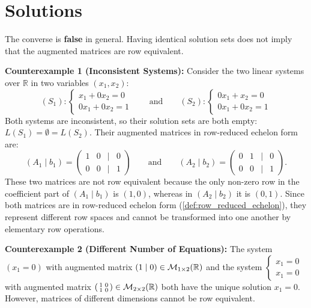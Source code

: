 \section{Solutions}\label{sec:solutions_linear_equations}

\begin{exercisesolution}
\label{sol:converse_ero_solution_set}
The converse is \textbf{false} in general. Having identical solution sets does not imply that the augmented matrices are row equivalent.

\textbf{Counterexample 1 (Inconsistent Systems):}
Consider the two linear systems over $\mathbb{R}$ in two variables $(x_1, x_2)$:
\[
(S_1): \begin{cases} x_1 + 0x_2 = 0 \\ 0x_1 + 0x_2 = 1 \end{cases} \qquad\text{and}\qquad (S_2): \begin{cases} 0x_1 + x_2 = 0 \\ 0x_1 + 0x_2 = 1 \end{cases}
\]
Both systems are inconsistent, so their solution sets are both empty: $L(S_1) = \emptyset = L(S_2)$.
Their augmented matrices in row-reduced echelon form are:
\[
(A_1 \mid b_1) = \begin{pmatrix} 1 & 0 & \big| & 0 \\ 0 & 0 & \big| & 1 \end{pmatrix} \qquad\text{and}\qquad (A_2 \mid b_2) = \begin{pmatrix} 0 & 1 & \big| & 0 \\ 0 & 0 & \big| & 1 \end{pmatrix}.
\]
These two matrices are not row equivalent because the only non-zero row in the coefficient part of $(A_1 \mid b_1)$ is $(1, 0)$, whereas in $(A_2 \mid b_2)$ it is $(0, 1)$. Since both matrices are in row-reduced echelon form (\cref{def:row_reduced_echelon}), they represent different row spaces and cannot be transformed into one another by elementary row operations.

\textbf{Counterexample 2 (Different Number of Equations):}
The system $(x_1 = 0)$ with augmented matrix $(1 \mid 0) \in \mathcal{M}_{1 \times 2}(\mathbb{R})$ and the system $\begin{cases} x_1 = 0 \\ x_1 = 0 \end{cases}$ with augmented matrix $\left(\begin{smallmatrix} 1 & 0 \\ 1 & 0 \end{smallmatrix}\right) \in \mathcal{M}_{2 \times 2}(\mathbb{R})$ both have the unique solution $x_1 = 0$. However, matrices of different dimensions cannot be row equivalent.


\end{exercisesolution}
